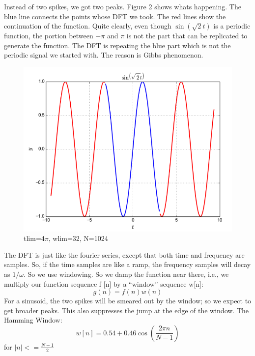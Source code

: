 \documentclass[11pt, a4paper]{article}
\begin{document}
   Instead of two spikes, we got two peaks. Figure 2 shows whats happening. The blue line connects the points whose DFT we took. The red lines show the continuation of the function. Quite clearly, even though $\sin(\sqrt{2} t)$ is a periodic function, the portion between $-\pi$ and $\pi$ is not the part that can be replicated to generate the function. The DFT is repeating the blue part which is not the periodic signal we started with. The reason is Gibbs phenomenon.

   
   \begin{figure}[!tbh]
   	\centering
  \includegraphics[scale=0.5]{q1.png} 
    \caption{tlim=4$\pi$, wlim=32, N=1024} 	
   \end{figure} 
   
     The DFT is just like the fourier series, except that both time and frequency are samples. So, if the time samples are like a ramp, the frequency samples will decay as $1/\omega$. So we use windowing. So we
damp the function near there, i.e., we multiply our function sequence f [n] by a “window” sequence w[n]: 
$$g(n)=f(n)w(n)$$
For a sinusoid, the two spikes will be smeared out by the window; so we expect to get broader peaks. This also suppresses the jump at the edge of the window. The Hamming Window:
$$w[n]=0.54+0.46\cos(\frac{2\pi n}{N-1})$$
for $|n|<=\frac{N-1}{2}$
\end{document}

